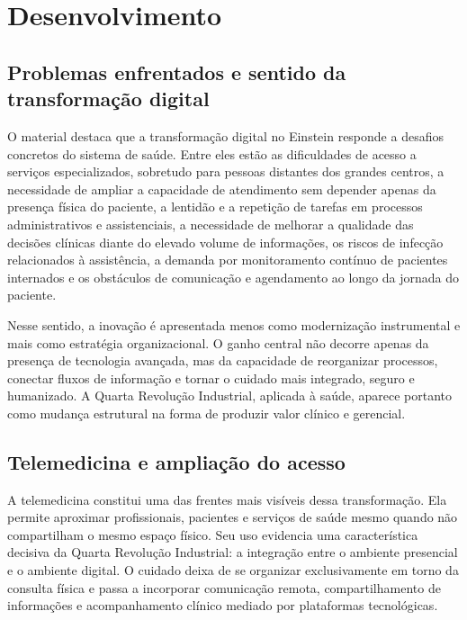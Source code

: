 \documentclass[12pt,a4paper]{article}
\begin{document}
\section{Desenvolvimento}
\label{sec:org3b2dee0}

\subsection{Problemas enfrentados e sentido da transformação digital}
\label{sec:org52db02d}

O material destaca que a transformação digital no Einstein responde a desafios concretos do sistema de saúde. Entre eles estão as dificuldades de acesso a serviços especializados, sobretudo para pessoas distantes dos grandes centros, a necessidade de ampliar a capacidade de atendimento sem depender apenas da presença física do paciente, a lentidão e a repetição de tarefas em processos administrativos e assistenciais, a necessidade de melhorar a qualidade das decisões clínicas diante do elevado volume de informações, os riscos de infecção relacionados à assistência, a demanda por monitoramento contínuo de pacientes internados e os obstáculos de comunicação e agendamento ao longo da jornada do paciente.

Nesse sentido, a inovação é apresentada menos como modernização instrumental e mais como estratégia organizacional. O ganho central não decorre apenas da presença de tecnologia avançada, mas da capacidade de reorganizar processos, conectar fluxos de informação e tornar o cuidado mais integrado, seguro e humanizado. A Quarta Revolução Industrial, aplicada à saúde, aparece portanto como mudança estrutural na forma de produzir valor clínico e gerencial.

\subsection{Telemedicina e ampliação do acesso}
\label{sec:org7dc3679}

A telemedicina constitui uma das frentes mais visíveis dessa transformação. Ela permite aproximar profissionais, pacientes e serviços de saúde mesmo quando não compartilham o mesmo espaço físico. Seu uso evidencia uma característica decisiva da Quarta Revolução Industrial: a integração entre o ambiente presencial e o ambiente digital. O cuidado deixa de se organizar exclusivamente em torno da consulta física e passa a incorporar comunicação remota, compartilhamento de informações e acompanhamento clínico mediado por plataformas tecnológicas.
\end{document}
